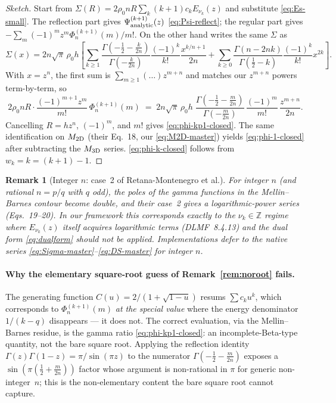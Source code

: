 \documentclass{article}
\newtheorem{remark}{Remark}
\begin{document}
\begin{proof}[Sketch]
Start from $\Sigma(R)=2\rho_0 nR\sum_k(k+1)c_kE_{\nu_k}(z)$ and substitute
\eqref{eq:Es-small}.  The reflection part gives $\Psi^{(k+1)}_{\rm analytic}(z)$
\eqref{eq:Psi-reflect}; the regular part gives
$-\sum_m(-1)^m z^m\Phi^{(k+1)}_n(m)/m!$.  On the other hand
\citet{RetanaMontenegro2012} writes the same $\Sigma$ as
\begin{equation*}
\Sigma(x)=2n\sqrt\pi\,\rho_0 h\!\left[\!
\sum_{k\ge1}\!\frac{\Gamma(-\tfrac12-\tfrac{k}{2n})}{\Gamma(-\tfrac{k}{2n})}
\frac{(-1)^k}{k!}\frac{x^{k/n+1}}{2n}
+\sum_{k\ge0}\!\frac{\Gamma(n-2nk)}{\Gamma(\tfrac12-k)}\frac{(-1)^k}{k!}x^{2k}\right]\!.
\end{equation*}
With $x=z^n$, the first sum is $\sum_{m\ge1}(\ldots)z^{m+n}$ and matches our
$z^{m+n}$ powers term-by-term, so
\begin{equation*}
2\rho_0 nR\cdot\frac{(-1)^{m+1}z^m}{m!}\,\Phi^{(k+1)}_n(m)
\;=\;2n\sqrt\pi\,\rho_0 h\;
\frac{\Gamma(-\tfrac12-\tfrac{m}{2n})}{\Gamma(-\tfrac{m}{2n})}\,
\frac{(-1)^m}{m!}\,\frac{z^{m+n}}{2n}.
\end{equation*}
Cancelling $R=hz^n$, $(-1)^m$, and $m!$ gives \eqref{eq:phi-kp1-closed}.
The same identification on $M_{\rm 2D}$ (their Eq.~18, our \eqref{eq:M2D-master})
yields \eqref{eq:phi-1-closed} after subtracting the $M_{\rm 3D}$ series.
\eqref{eq:phi-k-closed} follows from $w_k=k=(k+1)-1$.
\end{proof}

\begin{remark}[Integer $n$: case~2 of Retana-Montenegro et al.]\label{rem:case2}
For integer $n$ (and rational $n=p/q$ with $q$ odd), the poles of the gamma
functions in the Mellin--Barnes contour become double, and their case~2
gives a logarithmic-power series (Eqs.~19--20).  In our framework this
corresponds exactly to the $\nu_k\in\mathbb{Z}$ regime where $E_{\nu_k}(z)$
itself acquires logarithmic terms (DLMF~8.4.13) and the dual form
\eqref{eq:dualform} should not be applied.  Implementations defer to the
native series \eqref{eq:Sigma-master}--\eqref{eq:DS-master} for integer $n$.
\end{remark}

\paragraph{Why the elementary square-root guess of Remark~\ref{rem:noroot}
fails.}
The generating function $C(u)=2/(1+\sqrt{1-u})$ resums $\sum c_k u^k$, which
corresponds to $\Phi^{(k+1)}_n(m)$ \emph{at the special value} where the energy
denominator $1/(k-q)$ disappears --- it does not.  The correct evaluation, via
the Mellin--Barnes residue, is the gamma ratio \eqref{eq:phi-kp1-closed}:
an incomplete-Beta-type quantity, not the bare square root.  Applying the
reflection identity $\Gamma(z)\Gamma(1-z)=\pi/\sin(\pi z)$ to the numerator
$\Gamma(-\tfrac12-\tfrac{m}{2n})$ exposes a $\sin(\pi(\tfrac12+\tfrac{m}{2n}))$
factor whose argument is non-rational in $\pi$ for generic non-integer~$n$;
this is the non-elementary content the bare square root cannot capture.
\end{document}
